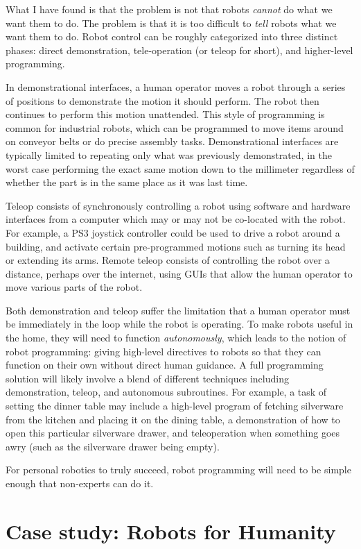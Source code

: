 \documentclass[11pt,twocolumn]{article}
\begin{document}
What I have found is that the problem is not that robots {\em cannot} do what we want them to do. The problem is that it is too difficult to {\em tell} robots what we want them to do. Robot control can be roughly categorized into three distinct phases: direct demonstration, tele-operation (or teleop for short), and higher-level programming.

In demonstrational interfaces, a human operator moves a robot through a series of positions to demonstrate the motion it should perform. The robot then continues to perform this motion unattended. This style of programming is common for industrial robots, which can be programmed to move items around on conveyor belts or do precise assembly tasks. Demonstrational interfaces are typically limited to repeating only what was previously demonstrated, in the worst case performing the exact same motion down to the millimeter regardless of whether the part is in the same place as it was last time.

Teleop consists of synchronously controlling a robot using software and hardware interfaces from a computer which may or may not be co-located with the robot. For example, a PS3 joystick controller could be used to drive a robot around a building, and activate certain pre-programmed motions such as turning its head or extending its arms. Remote teleop consists of controlling the robot over a distance, perhaps over the internet, using GUIs that allow the human operator to move various parts of the robot.

Both demonstration and teleop suffer the limitation that a human operator must be immediately in the loop while the robot is operating. To make robots useful in the home, they will need to function {\em autonomously}, which leads to the notion of robot programming: giving high-level directives to robots so that they can function on their own without direct human guidance.  A full programming solution will likely involve a blend of different techniques including demonstration, teleop, and autonomous subroutines. For example, a task of setting the dinner table may include a high-level program of fetching silverware from the kitchen and placing it on the dining table, a demonstration of how to open this particular silverware drawer, and teleoperation when something goes awry (such as the silverware drawer being empty).

For personal robotics to truly succeed, robot programming will need to be simple enough that non-experts can do it.

\section{Case study: Robots for Humanity}
\end{document}
